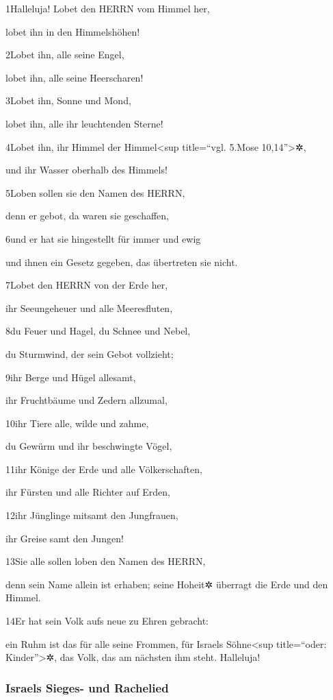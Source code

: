 1Halleluja! Lobet den HERRN vom Himmel her,

lobet ihn in den Himmelshöhen!

2Lobet ihn, alle seine Engel,

lobet ihn, alle seine Heerscharen!

3Lobet ihn, Sonne und Mond,

lobet ihn, alle ihr leuchtenden Sterne!

4Lobet ihn, ihr Himmel der Himmel\textless sup title=``vgl. 5.Mose
10,14''\textgreater✲,

und ihr Wasser oberhalb des Himmels!

5Loben sollen sie den Namen des HERRN,

denn er gebot, da waren sie geschaffen,

6und er hat sie hingestellt für immer und ewig

und ihnen ein Gesetz gegeben, das übertreten sie nicht.

7Lobet den HERRN von der Erde her,

ihr Seeungeheuer und alle Meeresfluten,

8du Feuer und Hagel, du Schnee und Nebel,

du Sturmwind, der sein Gebot vollzieht;

9ihr Berge und Hügel allesamt,

ihr Fruchtbäume und Zedern allzumal,

10ihr Tiere alle, wilde und zahme,

du Gewürm und ihr beschwingte Vögel,

11ihr Könige der Erde und alle Völkerschaften,

ihr Fürsten und alle Richter auf Erden,

12ihr Jünglinge mitsamt den Jungfrauen,

ihr Greise samt den Jungen!

13Sie alle sollen loben den Namen des HERRN,

denn sein Name allein ist erhaben; seine Hoheit✲ überragt die Erde und
den Himmel.

14Er hat sein Volk aufs neue zu Ehren gebracht:

ein Ruhm ist das für alle seine Frommen, für Israels Söhne\textless sup
title=``oder: Kinder''\textgreater✲, das Volk, das am nächsten ihm
steht. Halleluja!

\hypertarget{israels-sieges--und-rachelied}{%
\subsubsection{Israels Sieges- und
Rachelied}\label{israels-sieges--und-rachelied}}

